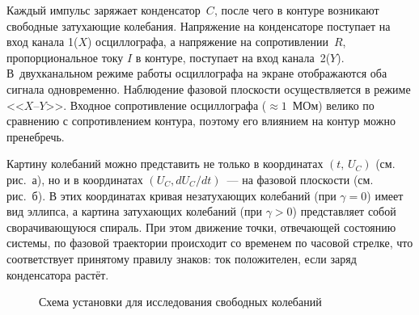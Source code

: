 Каждый импульс заряжает конденсатор~$C$, после чего в контуре возникают 
свободные затухающие колебания. Напряжение на конденсаторе поступает на вход 
канала 1($X$) осциллографа, а напряжение на сопротивлении~$R$, пропорциональное 
току $I$ в контуре, поступает на вход канала~2($Y$). В~двухканальном режиме
работы осциллографа на экране отображаются оба сигнала одновременно. Наблюдение 
фазовой плоскости осуществляется в режиме <<$X$--$Y$>>. Входное сопротивление 
осциллографа ($\approx 1$~МОм) велико по сравнению с сопротивлением
контура, поэтому его влиянием на контур можно пренебречь.

Картину колебаний можно представить не только в координатах $(t,\, U_C)$
(см. рис.~а), но и в координатах $(U_C, dU_C/dt)$~--- на фазовой плоскости 
(см. рис.~б). В этих координатах кривая незатухающих колебаний 
(при $\gamma=0$) имеет вид эллипса, а картина затухающих колебаний (при $\gamma > 0$) 
представляет собой сворачивающуюся спираль. При этом движение точки, отвечающей 
состоянию системы, по фазовой траектории происходит со временем по часовой стрелке, 
что соответствует принятому правилу знаков: ток положителен, 
если заряд конденсатора растёт.

\begin{figure}[h!]
    \centering\small
	\caption{Схема установки для исследования свободных колебаний}
\end{figure}

